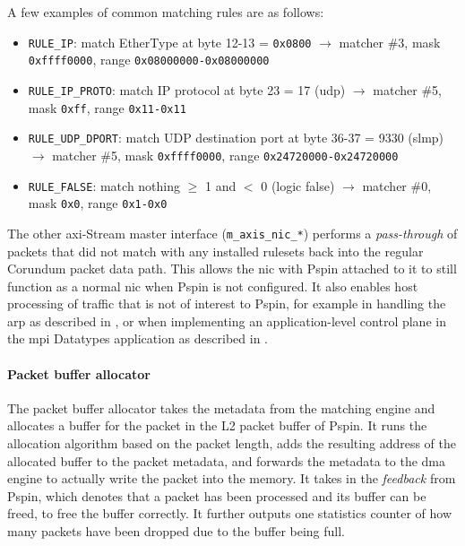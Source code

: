 A few examples of common matching rules are as follows:
\begin{itemize}
    \item \texttt{RULE\_IP}: match EtherType at byte 12-13 = \texttt{0x0800} $\rightarrow$ matcher \#3, mask \texttt{0xffff0000}, range \texttt{0x08000000-0x08000000}
    \item \texttt{RULE\_IP\_PROTO}: match IP protocol at byte 23 = 17 (\acs{udp}) $\rightarrow$ matcher \#5, mask \texttt{0xff}, range \texttt{0x11-0x11}
    \item \texttt{RULE\_UDP\_DPORT}: match UDP destination port at byte 36-37 = 9330 (\acs{slmp}) $\rightarrow$ matcher \#5, mask \texttt{0xffff0000}, range \texttt{0x24720000-0x24720000}
    \item \texttt{RULE\_FALSE}: match nothing $\ge$ 1 and $<$ 0 (logic false) $\rightarrow$ matcher \#0, mask \texttt{0x0}, range \texttt{0x1-0x0}
\end{itemize}

The other \ac{axi}-Stream master interface (\texttt{m\_\-axis\_\-nic\_\-*}) performs a \emph{pass-through} of packets that did not match with any installed rulesets back into the regular Corundum packet data path.  This allows the \ac{nic} with P\acs{spin} attached to it to still function as a normal \ac{nic} when P\acs{spin} is not configured.  It also enables host processing of traffic that is not of interest to P\acs{spin}, for example in handling the \ac{arp} as described in , or when implementing an application-level control plane in the \ac{mpi} Datatypes application as described in .

\paragraph{Packet buffer allocator} The packet buffer allocator takes the metadata from the matching engine and allocates a buffer for the packet in the L2 packet buffer of P\acs{spin}.  It runs the allocation algorithm based on the packet length, adds the resulting address of the allocated buffer to the packet metadata, and forwards the metadata to the \ac{dma} engine to actually write the packet into the memory.  It takes in the \emph{feedback} from P\acs{spin}, which denotes that a packet has been processed and its buffer can be freed, to free the buffer correctly.  It further outputs one statistics counter of how many packets have been dropped due to the buffer being full.

